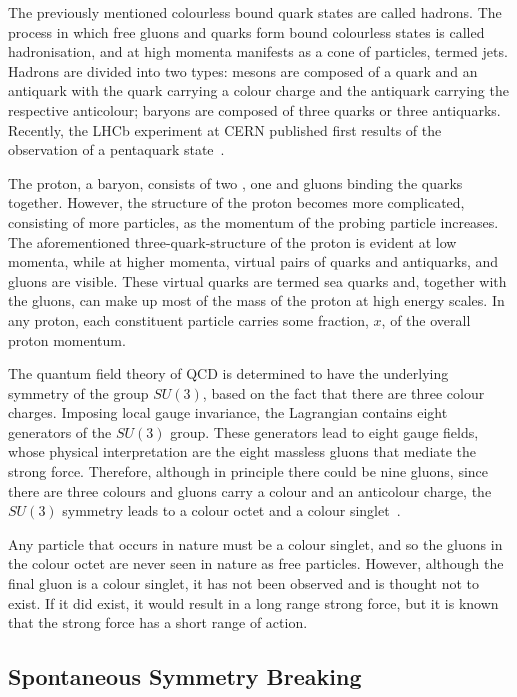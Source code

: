 The previously mentioned colourless bound quark states are called hadrons. The process in which free gluons
and quarks form bound colourless states is called hadronisation, and at high momenta manifests as a cone of
particles, termed jets. Hadrons are divided into two types: mesons are composed of a quark and an antiquark
with the quark carrying a colour charge and the antiquark carrying the respective anticolour; baryons are
composed of three quarks or three antiquarks. Recently, the LHCb experiment at CERN published first results of
the observation of a pentaquark state~\cite{Aaij:2015tga}.

The proton, a baryon, consists of two \uquarks, one \dquark and gluons binding the quarks together. However,
the structure of the proton becomes more complicated, consisting of more particles, as the momentum of the
probing particle increases. The aforementioned three-quark-structure of the proton is evident at low momenta,
while at higher momenta, virtual pairs of quarks and antiquarks, and gluons are visible. These virtual quarks
are termed sea quarks and, together with the gluons, can make up most of the mass of the proton at high energy
scales. In any proton, each constituent particle carries some fraction, $x$, of the overall proton momentum.

The quantum field theory of QCD is determined to have the underlying symmetry of the group $SU(3)$, based on
the fact that there are three colour charges. Imposing local gauge invariance, the Lagrangian contains eight
generators of the $SU(3)$ group. These generators lead to eight gauge fields, whose physical interpretation
are the eight massless gluons that mediate the strong force. Therefore, although in principle there could be
nine gluons, since there are three colours and gluons carry a colour and an anticolour charge, the $SU(3)$
symmetry leads to a colour octet and a colour singlet~\cite{Griffiths:1987tj}.

Any particle that occurs in nature must be a colour singlet, and so the gluons in the colour octet are never
seen in nature as free particles. However, although the final gluon is a colour singlet, it has not been
observed and is thought not to exist. If it did exist, it would result in a long range strong force, but it is
known that the strong force has a short range of action.

\subsection{Spontaneous Symmetry Breaking}
\label{ss:spontaneous_symmetry_breaking}


